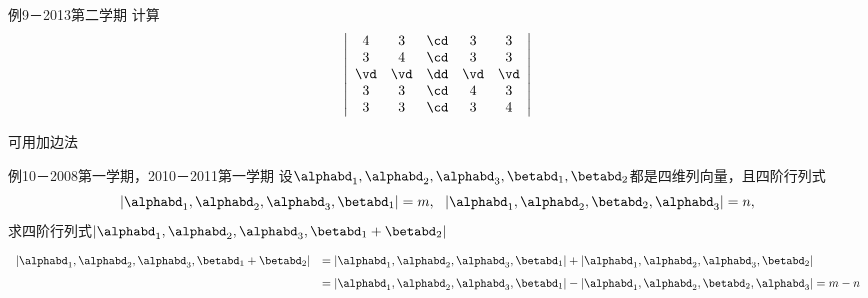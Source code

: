 \begin{frame}
  \begin{footnotesize}
    \begin{exampleblock}{例9－2013第二学期}
      计算
      $$
      \left|
      \begin{array}{ccccc}
        4&3&\cd&3&3\\
        3&4&\cd&3&3\\
        \vd&\vd&\dd&\vd&\vd\\
        3&3&\cd&4&3\\
        3&3&\cd&3&4
      \end{array}
      \right|
      $$
    \end{exampleblock}
    \pause\jiename
      可用加边法

  \end{footnotesize}
\end{frame}


\begin{frame}
  \begin{footnotesize}
    \begin{exampleblock}{例10－2008第一学期，2010－2011第一学期}
      设$\alphabd_1,\alphabd_2,\alphabd_3,\betabd_1,\betabd_2$都是四维列向量，且四阶行列式
      $$
      |\alphabd_1,\alphabd_2,\alphabd_3,\betabd_1|=m,~~
      |\alphabd_1,\alphabd_2,\betabd_2,\alphabd_3|=n,      
      $$
      求四阶行列式$|\alphabd_1,\alphabd_2,\alphabd_3,\betabd_1+\betabd_2|$
    \end{exampleblock}
    \pause\jiename
    $$
    \begin{array}{rl}
      |\alphabd_1,\alphabd_2,\alphabd_3,\betabd_1+\betabd_2|&=
      |\alphabd_1,\alphabd_2,\alphabd_3,\betabd_1|+
      |\alphabd_1,\alphabd_2,\alphabd_3,\betabd_2|\\[0.1in]
      &=
      |\alphabd_1,\alphabd_2,\alphabd_3,\betabd_1|-
      |\alphabd_1,\alphabd_2,\betabd_2,\alphabd_3|=m-n
    \end{array}
    $$
  \end{footnotesize}
\end{frame}


